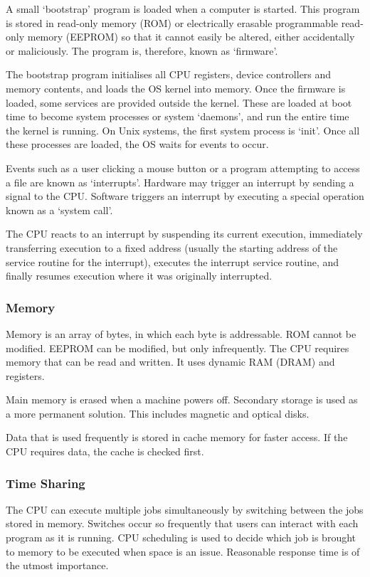 A small `bootstrap' program is loaded when a computer is started.
This program is stored in read-only memory (ROM) or electrically erasable programmable read-only memory (EEPROM) so that it cannot easily be altered, either accidentally or maliciously.
The program is, therefore, known as `firmware'.

The bootstrap program initialises all CPU registers, device controllers and memory contents, and loads the OS kernel into memory.
Once the firmware is loaded, some services are provided outside the kernel.
These are loaded at boot time to become system processes or system `daemons', and run the entire time the kernel is running.
On Unix systems, the first system process is `init'.
Once all these processes are loaded, the OS waits for events to occur.

Events such as a user clicking a mouse button or a program attempting to access a file are known as `interrupts'.
Hardware may trigger an interrupt by sending a signal to the CPU.
Software triggers an interrupt by executing a special operation known as a `system call'.

The CPU reacts to an interrupt by suspending its current execution, immediately transferring execution to a fixed address (usually the starting address of the service routine for the interrupt), executes the interrupt service routine, and finally resumes execution where it was originally interrupted.

\subsubsection{Memory}

Memory is an array of bytes, in which each byte is addressable.
ROM cannot be modified.
EEPROM can be modified, but only infrequently.
The CPU requires memory that can be read and written.
It uses dynamic RAM (DRAM) and registers.

Main memory is erased when a machine powers off.
Secondary storage is used as a more permanent solution.
This includes magnetic and optical disks.

Data that is used frequently is stored in cache memory for faster access.
If the CPU requires data, the cache is checked first.

\subsubsection{Time Sharing}

The CPU can execute multiple jobs simultaneously by switching between the jobs stored in memory.
Switches occur so frequently that users can interact with each program as it is running.
CPU scheduling is used to decide which job is brought to memory to be executed when space is an issue.
Reasonable response time is of the utmost importance.

